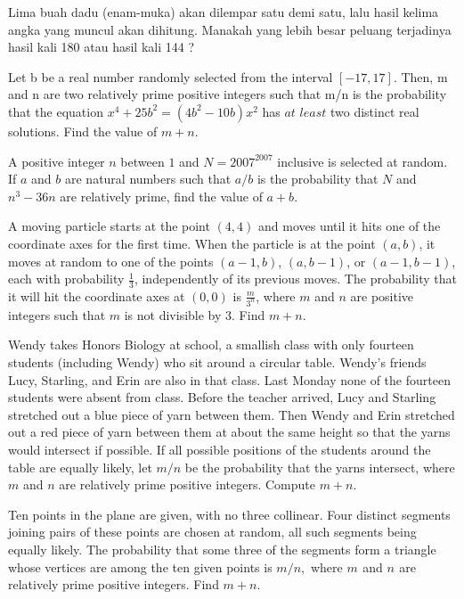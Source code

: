 \documentclass[12pt]{scrartcl}
\begin{document}
\begin{soaljawab} 
    Lima buah dadu (enam-muka) akan dilempar satu demi satu, lalu hasil kelima angka yang muncul akan dihitung. Manakah yang lebih besar peluang terjadinya hasil kali 180 atau hasil kali 144 ? 
\end{soaljawab}

\begin{soaljawab} [iTest 2007]
    Let b be a real number randomly selected from the interval $[-17,17]$. Then, m and n are two relatively prime positive integers such that m/n is the probability that the equation $x^4+25b^2=(4b^2-10b)x^2$ has $\textit{at least}$ two distinct real solutions. Find the value of $m+n$.
\end{soaljawab}

\begin{soaljawab} [iTest 2007]
    A positive integer $n$ between $1$ and $N=2007^{2007}$ inclusive is selected at random. If $a$ and $b$ are natural numbers such that $a/b$ is the probability that $N$ and $n^3-36n$ are relatively prime, find the value of $a+b$.
\end{soaljawab}

\begin{soaljawab} [AIME 2019]
    A moving particle starts at the point $(4,4)$ and moves until it hits one of the coordinate axes for the first time. When the particle is at the point $(a,b)$, it moves at random to one of the points $(a-1,b)$, $(a,b-1)$, or $(a-1,b-1)$, each with probability $\frac{1}{3}$, independently of its previous moves. The probability that it will hit the coordinate axes at $(0,0)$ is $\frac{m}{3^n}$, where $m$ and $n$ are positive integers such that $m$ is not divisible by $3$. Find $m + n$.
\end{soaljawab}

\begin{soaljawab} [iTest 2008]
    Wendy takes Honors Biology at school, a smallish class with only fourteen students (including Wendy) who sit around a circular table. Wendy’s friends Lucy, Starling, and Erin are also in that class. Last Monday none of the fourteen students were absent from class. Before the teacher arrived, Lucy and Starling stretched out a blue piece of yarn between them. Then Wendy and Erin stretched out a red piece of yarn between them at about the same height so that the yarns would intersect if possible. If all possible positions of the students around the table are equally likely, let $m/n$ be the probability that the yarns intersect, where $m$ and $n$ are relatively prime positive integers. Compute $m + n$.
\end{soaljawab}

\begin{soaljawab}[AIME 1999]
    Ten points in the plane are given, with no three collinear. Four distinct segments joining pairs of these points are chosen at random, all such segments being equally likely. The probability that some three of the segments form a triangle whose vertices are among the ten given points is $m/n,$ where $m_{}$ and $n_{}$ are relatively prime positive integers. Find $m+n.$
\end{soaljawab}
\end{document}
